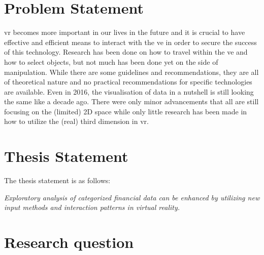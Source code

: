 
\section{Problem Statement}

\gls{vr} becomes more important in our lives in the future and it is crucial to have effective and efficient means to interact with the \gls{ve} in order to secure the success of this technology. Research has been done on how to travel within the \gls{ve} and how to select objects, but not much has been done yet on the side of manipulation. While there are some guidelines and recommendations, they are all of theoretical nature and no practical recommendations for specific technologies are available. \newline
Even in 2016, the visualisation of data in a nutshell is still looking the same like a decade ago. There were only minor advancements that all are still focusing on the (limited) 2D space while only little research has been made in how to utilize the (real) third dimension in \gls{vr}.



\section{Thesis Statement}

\newcommand{\thesisstatementtext}{Exploratory analysis of categorized financial data can be enhanced by utilizing new input methods and interaction patterns in virtual reality.}

\label{TS}

The thesis statement is as follows:
\begin{framed}
	\textit{\thesisstatementtext}
\end{framed}


\section{Research question}

